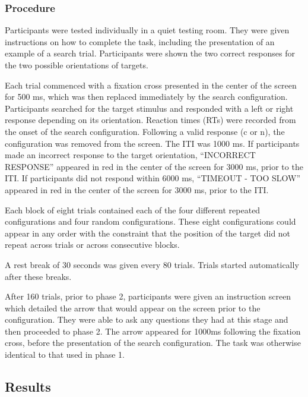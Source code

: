 \documentclass[
  man,floatsintext]{apa7}
\begin{document}
\hypertarget{procedure}{%
\subsubsection{Procedure}\label{procedure}}

Participants were tested individually in a quiet testing room. They were given instructions on how to complete the task, including the presentation of an example of a search trial. Participants were shown the two correct responses for the two possible orientations of targets.

Each trial commenced with a fixation cross presented in the center of the screen for 500 ms, which was then replaced immediately by the search configuration. Participants searched for the target stimulus and responded with a left or right response depending on its orientation. Reaction times (RTs) were recorded from the onset of the search configuration. Following a valid response (c or n), the configuration was removed from the screen. The ITI was 1000 ms. If participants made an incorrect response to the target orientation, ``INCORRECT RESPONSE'' appeared in red in the center of the screen for 3000 ms, prior to the ITI. If participants did not respond within 6000 ms, ``TIMEOUT - TOO SLOW'' appeared in red in the center of the screen for 3000 ms, prior to the ITI.

Each block of eight trials contained each of the four different repeated configurations and four random configurations. These eight configurations could appear in any order with the constraint that the position of the target did not repeat across trials or across consecutive blocks.

A rest break of 30 seconds was given every 80 trials. Trials started automatically after these breaks.

After 160 trials, prior to phase 2, participants were given an instruction screen which detailed the arrow that would appear on the screen prior to the configuration. They were able to ask any questions they had at this stage and then proceeded to phase 2. The arrow appeared for 1000ms following the fixation cross, before the presentation of the search configuration. The task was otherwise identical to that used in phase 1.

\hypertarget{results}{%
\subsection{Results}\label{results}}
\end{document}
